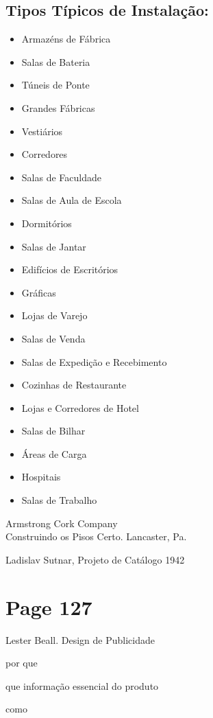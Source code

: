 \documentclass[a4paper]{article}
\begin{document}
\subsection*{Tipos Típicos de Instalação:}
\begin{itemize}
    \item Armazéns de Fábrica
    \item Salas de Bateria
    \item Túneis de Ponte
    \item Grandes Fábricas
    \item Vestiários
    \item Corredores
    \item Salas de Faculdade
    \item Salas de Aula de Escola
    \item Dormitórios
    \item Salas de Jantar
    \item Edifícios de Escritórios
    \item Gráficas
    \item Lojas de Varejo
    \item Salas de Venda
    \item Salas de Expedição e Recebimento
    \item Cozinhas de Restaurante
    \item Lojas e Corredores de Hotel
    \item Salas de Bilhar
    \item Áreas de Carga
    \item Hospitais
    \item Salas de Trabalho
\end{itemize}

Armstrong Cork Company\\
Construindo os Pisos Certo. Lancaster, Pa.

\vspace{2em} %

Ladislav Sutnar, Projeto de Catálogo 1942

\newpage
\section*{Page 127}

Lester Beall. Design de Publicidade

por que

que informação essencial do produto

como
\end{document}
